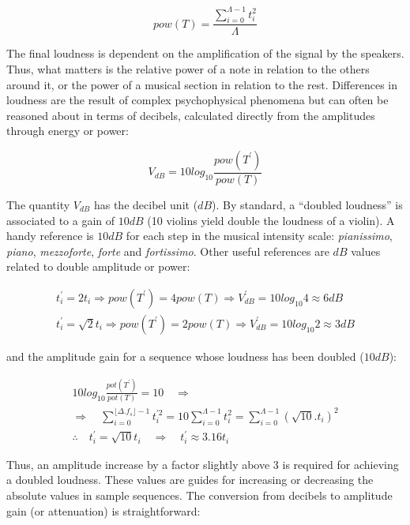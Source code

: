 \begin{equation}\label{eq:potencia}
pow(T)=\frac{\sum_{i=0}^{\Lambda -1} t_i^2}{\Lambda}
\end{equation} 

The final loudness is dependent on the amplification of the signal by the speakers.
Thus, what matters is the relative power of a note in relation to the others around it,
or the power of a musical section in relation to the rest. Differences in loudness are the result of complex psychophysical phenomena but can often be reasoned about in terms of decibels, calculated directly from the amplitudes through energy or power:

\begin{equation}\label{decibels}
V_{dB}=10log_{10}\frac{pow(T^{'})}{pow(T)}
\end{equation}

The quantity $V_{dB}$ has the decibel unit ($dB$). 
By standard, a ``doubled loudness'' is associated to a gain of $10dB$ (10 violins yield double the loudness of a violin).
A handy reference is $10dB$ for each step in the musical intensity scale: \emph{pianissimo}, \emph{piano}, \emph{mezzoforte}, \emph{forte} and \emph{fortissimo}. Other useful references are $dB$ values related to double amplitude or power:

\begin{align}
t_i^{'}=2 t_i \Rightarrow pow(T^{'})=4 pow(T) \Rightarrow V^{'}_{dB}=10log_{10} 4 \approx 6 dB \label{eq:ampVol}\\
t_i^{'}=\sqrt{2} t_i \Rightarrow pow(T^{'})=2 pow(T) \Rightarrow V^{'}_{dB}=10log_{10} 2 \approx 3 dB\label{eq:potVol}
\end{align}

\noindent and the amplitude gain for a sequence whose loudness has been doubled ($10dB$):

\begin{equation}\label{eq:dobraVol}
\begin{split}
10log_{10}\frac{pot(T^{'})}{pot(T)} = 10 \quad \Rightarrow \\ \Rightarrow \quad \sum_{i=0}^{\lfloor \Delta.f_s \rfloor -1}t^{'2}_i=10\sum_{i=0}^{\Lambda-1}t_i^2=\sum_{i=0}^{\Lambda-1}(\sqrt{10}.t_i)^2 \\
\therefore \quad t^{'}_i=\sqrt{10}t_i \quad \Rightarrow \quad t^{'}_i \approx 3.16t_i
\end{split}
\end{equation}

Thus, an amplitude increase by a factor slightly above 3 is required for achieving a doubled loudness.
These values are guides for increasing or decreasing the absolute values in sample sequences.
The conversion from decibels to amplitude gain (or attenuation) is straightforward:

